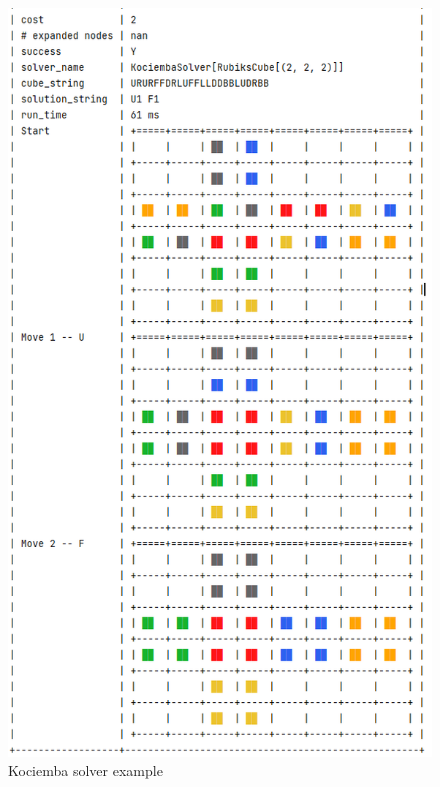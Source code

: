 \begin{figure}[H]
\centering
\includegraphics[scale=0.55]{./Figures/examplekociemba}
\caption[Examples]{Kociemba solver example}
\label{fig:examplekociemba}
\end{figure}



\label{ASSS}




